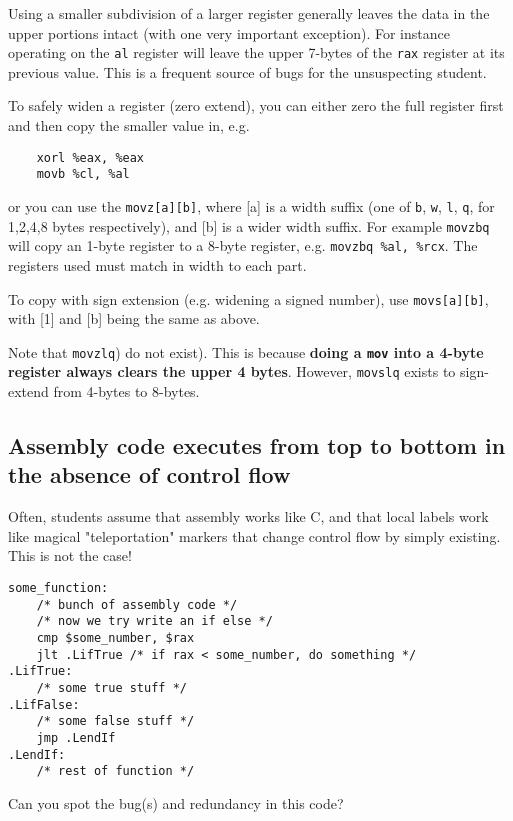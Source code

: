 \documentclass[11pt]{article}
\begin{document}
Using a smaller subdivision of a larger register generally leaves the data in the upper
portions intact (with one very important exception). For instance operating on the
\texttt{al} register will leave the upper 7-bytes of the \texttt{rax} register at its
previous value. This is a frequent source of bugs for the unsuspecting student.

To safely widen a register (zero extend), you can either zero the full register first and
then copy the smaller value in, e.g.

\begin{lstlisting}
    xorl %eax, %eax
    movb %cl, %al
\end{lstlisting}

or you can use the \texttt{movz[a][b]}, where [a] is a width suffix (one of \texttt{b},
\texttt{w}, \texttt{l}, \texttt{q}, for 1,2,4,8 bytes respectively), and [b] is a wider
width suffix. For example \texttt{movzbq} will copy an 1-byte register to a 8-byte
register, e.g. \texttt{movzbq \%al, \%rcx}. The registers used must match in width to each
part.

To copy with sign extension (e.g. widening a signed number), use \texttt{movs[a][b]}, with
[1] and [b] being the same as above.

Note that \texttt{movzlq}) do not exist). This is because \textbf{doing a \texttt{mov}
into a 4-byte register always clears the upper 4 bytes}. However, \texttt{movslq} exists
to sign-extend from 4-bytes to 8-bytes.

\subsection{Assembly code executes from top to bottom in the absence of control flow}

Often, students assume that assembly works like C, and that local labels work like magical
"teleportation" markers that change control flow by simply existing. This is not the case!

\begin{lstlisting}
some_function:
    /* bunch of assembly code */
    /* now we try write an if else */
    cmp $some_number, $rax
    jlt .LifTrue /* if rax < some_number, do something */
.LifTrue:
    /* some true stuff */
.LifFalse:
    /* some false stuff */
    jmp .LendIf
.LendIf:
    /* rest of function */
\end{lstlisting}

Can you spot the bug(s) and redundancy in this code?
\end{document}
